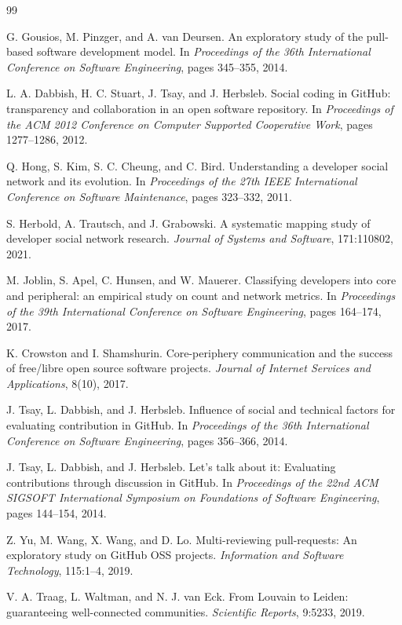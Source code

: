 \documentclass[11pt]{article}
\begin{document}
\begin{thebibliography}{99}

G. Gousios, M. Pinzger, and A. van Deursen.
\newblock An exploratory study of the pull-based software development model.
\newblock In \textit{Proceedings of the 36th International Conference on Software Engineering}, pages 345--355, 2014.

L. A. Dabbish, H. C. Stuart, J. Tsay, and J. Herbsleb.
\newblock Social coding in GitHub: transparency and collaboration in an open software repository.
\newblock In \textit{Proceedings of the ACM 2012 Conference on Computer Supported Cooperative Work}, pages 1277--1286, 2012.

Q. Hong, S. Kim, S. C. Cheung, and C. Bird.
\newblock Understanding a developer social network and its evolution.
\newblock In \textit{Proceedings of the 27th IEEE International Conference on Software Maintenance}, pages 323--332, 2011.

S. Herbold, A. Trautsch, and J. Grabowski.
\newblock A systematic mapping study of developer social network research.
\newblock \textit{Journal of Systems and Software}, 171:110802, 2021.

M. Joblin, S. Apel, C. Hunsen, and W. Mauerer.
\newblock Classifying developers into core and peripheral: an empirical study on count and network metrics.
\newblock In \textit{Proceedings of the 39th International Conference on Software Engineering}, pages 164--174, 2017.

K. Crowston and I. Shamshurin.
\newblock Core-periphery communication and the success of free/libre open source software projects.
\newblock \textit{Journal of Internet Services and Applications}, 8(10), 2017.

J. Tsay, L. Dabbish, and J. Herbsleb.
\newblock Influence of social and technical factors for evaluating contribution in GitHub.
\newblock In \textit{Proceedings of the 36th International Conference on Software Engineering}, pages 356--366, 2014.

J. Tsay, L. Dabbish, and J. Herbsleb.
\newblock Let's talk about it: Evaluating contributions through discussion in GitHub.
\newblock In \textit{Proceedings of the 22nd ACM SIGSOFT International Symposium on Foundations of Software Engineering}, pages 144--154, 2014.

Z. Yu, M. Wang, X. Wang, and D. Lo.
\newblock Multi-reviewing pull-requests: An exploratory study on GitHub OSS projects.
\newblock \textit{Information and Software Technology}, 115:1--4, 2019.

V. A. Traag, L. Waltman, and N. J. van Eck.
\newblock From Louvain to Leiden: guaranteeing well-connected communities.
\newblock \textit{Scientific Reports}, 9:5233, 2019.

\end{thebibliography}
\end{document}
